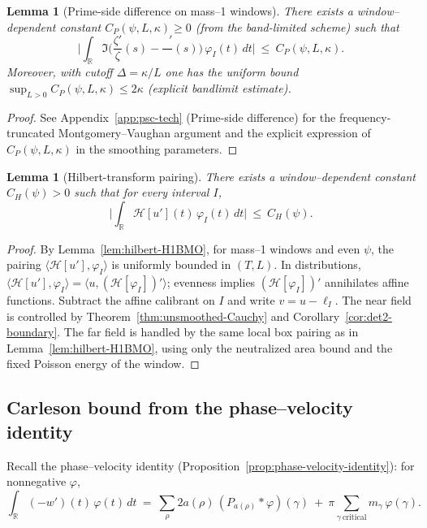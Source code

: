 \documentclass[11pt]{article}
\newtheorem{lemma}[theorem]{Lemma}
\theoremstyle{definition}
\theoremstyle{remark}
\newcommand{\R}{\mathbb{R}}
\DeclareMathOperator{\dettwo}{det_2}
\begin{document}
\begin{lemma}[Prime-side difference on mass–1 windows]\label{lem:prime-short}
There exists a window–dependent constant \(C_P(\psi,L,\kappa)\ge 0\) (from the band-limited scheme) such that
\[ \Big|\int_{\R} \Im\Big(\frac{\zeta'}{\zeta}(s)-\frac{\dettwo'}{\dettwo}(s)\Big)\,\varphi_I(t)\,dt\Big|\ \le\ C_P(\psi,L,\kappa).\]
Moreover, with cutoff \(\Delta=\kappa/L\) one has the uniform bound \(\sup_{L>0} C_P(\psi,L,\kappa)\le 2\kappa\) (explicit bandlimit estimate).
\end{lemma}
\begin{proof}
See Appendix~\ref{app:psc-tech} (Prime-side difference) for the frequency-truncated Montgomery–Vaughan argument and the explicit expression of \(C_P(\psi,L,\kappa)\) in the smoothing parameters.
\end{proof}

\begin{lemma}[Hilbert-transform pairing]\label{lem:hilbert-aux2}
There exists a window–dependent constant \(C_H(\psi)>0\) such that for every interval \(I\),
\[ \Big|\int_{\R} \mathcal H[u'](t)\,\varphi_I(t)\,dt\Big|\ \le\ C_H(\psi).\]
\end{lemma}
\begin{proof}
By Lemma~\ref{lem:hilbert-H1BMO}, for mass–1 windows and even \(\psi\), the pairing \(\langle \mathcal H[u'],\varphi_I\rangle\) is uniformly bounded in \((T,L)\). In distributions, \(\langle \mathcal H[u'],\varphi_I\rangle=\langle u,(\mathcal H[\varphi_I])'\rangle\); evenness implies \((\mathcal H[\varphi_I])'\) annihilates affine functions. Subtract the affine calibrant on \(I\) and write \(v=u-\ell_I\). The near field is controlled by Theorem~\ref{thm:unsmoothed-Cauchy} and Corollary~\ref{cor:det2-boundary}. The far field is handled by the same local box pairing as in Lemma~\ref{lem:hilbert-H1BMO}, using only the neutralized area bound and the fixed Poisson energy of the window.
\end{proof}

\subsection{Carleson bound from the phase--velocity identity}
Recall the phase--velocity identity (Proposition~\ref{prop:phase-velocity-identity}): for nonnegative \(\varphi\),
\[ \int_{\R}(-w')(t)\,\varphi(t)\,dt\ =\ \sum_{\rho}2a(\rho)\,(P_{a(\rho)}*\varphi)(\gamma)\ +\ \pi\sum_{\gamma\ \mathrm{critical}} m_\gamma\,\varphi(\gamma).\]
\end{document}
